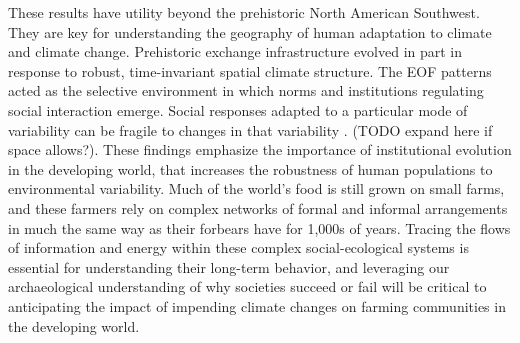 \documentclass[10pt]{iopart}
\begin{document}
These results have utility beyond the prehistoric North American Southwest. They are key for understanding the geography of human adaptation to climate and climate change. Prehistoric exchange infrastructure evolved in part in response to robust, time-invariant spatial climate structure. The EOF patterns acted as the selective environment in which norms and institutions regulating social interaction emerge. Social responses adapted to a particular mode of variability can be fragile to changes in that variability \parencite{Janssen2007}. (TODO expand here if space allows?). These findings emphasize the importance of institutional evolution in the developing world, that increases the robustness of human populations to environmental variability. Much of the world's food is still grown on small farms, and these farmers rely on complex networks of formal and informal arrangements in much the same way as their forbears have for 1,000s of years. Tracing the flows of information and energy within these complex social-ecological systems is essential for understanding their long-term behavior, and leveraging our archaeological understanding of why societies succeed or fail will be critical to anticipating the impact of impending climate changes on farming communities in the developing world.






\end{document}
